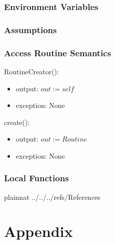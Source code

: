 \documentclass[12pt, titlepage]{article}
\begin{document}
\subsubsection{Environment Variables}

\subsubsection{Assumptions}

\subsubsection{Access Routine Semantics}

\noindent RoutineCreator():
\begin{itemize}
	\item output: $out := self$
	\item exception: None
\end{itemize}

\noindent create():
\begin{itemize}
	\item output: $out := Routine$
	\item exception: None
\end{itemize}

\subsubsection{Local Functions}

\newpage

 {plainnat}
 {../../../refs/References}

\newpage

\section{Appendix} \label{Appendix}

\end{document}
